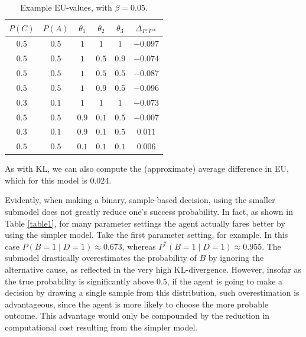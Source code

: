 \documentclass[10pt,letterpaper]{article}
\begin{document}
\begin{table}[h]  \begin{center}
\begin{tabular}{c | c | c | c | c || c}
 $P(C)$ & $P(A)$ & $\theta_1$ & $\theta_2$ & $\theta_3$ & $\Delta_{P,P*}$ \\ \hline
 $0.5$ & $0.5$ & $1$ & $1$ & $1$  & $-0.097$ \\
  $0.5$ & $0.5$ & $1$ & $0.5$ & $0.9$  & $-0.074$ \\
  $0.5$ & $0.5$ &$1$ & $0.5$ & $0.5$  & $-0.087$ \\
 $0.5$ & $0.5$ & $1$ & $0.9$ & $0.5$  & $-0.096$ \\
  $0.3$ & $0.1$ & $1$ & $1$ & $1$ & $-0.073$ \\
 $0.5$ & $0.5$ &  $0.9$ & $0.1$ & $0.5$  & $-0.007$ \\
  $0.3$ & $0.1$ & $0.9$ & $0.1$ & $0.5$ & $0.011$ \\
 $0.5$ & $0.5$ & $0.1$ & $0.1$ & $0.1$ & $0.006$ 
\end{tabular} \end{center} \caption{Example EU-values, with $\beta = 0.05$.} \label{table2}
\end{table}

 \noindent As with KL, we can also compute the (approximate) average difference in EU, which for this model is $0.024$.

Evidently, when making a binary, sample-based decision, using the smaller submodel does not greatly reduce one's success probability. In fact, as shown in Table \ref{table1}, for many parameter settings the agent actually fares better by using the simpler model. Take the first parameter setting, for example. In this case $P(B=1\mid D=1) \approx 0.673$, whereas $P^*(B=1 \mid D=1) \approx 0.955$. The submodel drastically overestimates the probability of $B$ by ignoring the alternative cause, as reflected in the very high KL-divergence. However, insofar as the true probability is significantly above $0.5$, if the agent is going to make a decision by drawing a single sample from this distribution, such overestimation is advantageous, since the agent is more likely to choose the more probable outcome. This advantage would only be compounded by the reduction in computational cost resulting from the simpler model.
\end{document}
